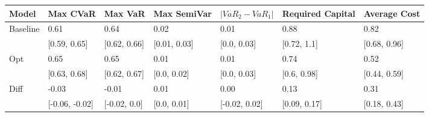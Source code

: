 \begin{tabular}{lllllll}
\toprule
   Model &       Max CVaR &      Max VaR &  Max SemiVar & $|VaR_2 - VaR_1|$ & Required Capital & Average Cost \\
\midrule
Baseline &           0.61 &         0.64 &         0.02 &              0.01 &             0.88 &         0.82 \\
         &   [0.59, 0.65] & [0.62, 0.66] & [0.01, 0.03] &       [0.0, 0.03] &      [0.72, 1.1] & [0.68, 0.96] \\
     Opt &           0.65 &         0.65 &         0.01 &              0.01 &             0.74 &         0.52 \\
         &   [0.63, 0.68] & [0.62, 0.67] &  [0.0, 0.02] &       [0.0, 0.03] &      [0.6, 0.98] & [0.44, 0.59] \\
    Diff &          -0.03 &        -0.01 &         0.01 &              0.00 &             0.13 &         0.31 \\
         & [-0.06, -0.02] & [-0.02, 0.0] &  [0.0, 0.01] &     [-0.02, 0.02] &     [0.09, 0.17] & [0.18, 0.43] \\
\bottomrule
\end{tabular}
